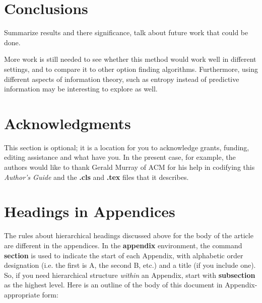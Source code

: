 \documentclass{acm_proc_article-sp}
\begin{document}
\section{Conclusions}

Summarize results and there significance, talk about future work that could be done.

More work is still needed to see whether this method would work well in different settings, and to compare it to other option finding algorithms. Furthermore, using different aspects of information theory, such as entropy instead of predictive information may be interesting to explore as well.

\section{Acknowledgments}
This section is optional; it is a location for you
to acknowledge grants, funding, editing assistance and
what have you.  In the present case, for example, the
authors would like to thank Gerald Murray of ACM for
his help in codifying this \textit{Author's Guide}
and the \textbf{.cls} and \textbf{.tex} files that it describes.

%

%
%
\appendix
\section{Headings in Appendices}
The rules about hierarchical headings discussed above for
the body of the article are different in the appendices.
In the \textbf{appendix} environment, the command
\textbf{section} is used to
indicate the start of each Appendix, with alphabetic order
designation (i.e. the first is A, the second B, etc.) and
a title (if you include one).  So, if you need
hierarchical structure
\textit{within} an Appendix, start with \textbf{subsection} as the
highest level. Here is an outline of the body of this
document in Appendix-appropriate form:
\end{document}
